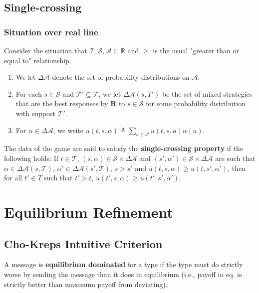 \documentclass[11pt]{elegantbook}
\begin{document}
\subsection{Single-crossing}

\subsubsection{Situation over real line}
Consider the situation that $\mathcal{T},\mathcal{S},\mathcal{A}\subseteq \mathbb{R}$ and $\geq$ is the usual "greater than or equal to" relationship.

\begin{enumerate}
    \item We let $\Delta \mathcal{A}$ denote the set of probability distributions on $\mathcal{A}$.
    \item For each $s\in \mathcal{S}$ and $\mathcal{T}'\subseteq \mathcal{T}$, we let $\Delta\mathcal{A}(s,T')$ be the set of mixed strategies that are the best responses by $\mathbf{R}$ to $s\in \mathcal{S}$ for some probability distribution with support $\mathcal{T}'$.
    \item For $\alpha\in \Delta\mathcal{A}$, we write $u(t,s,\alpha)\triangleq \sum_{a\in \mathcal{A}}u(t,s,a)\alpha(a)$.
\end{enumerate}

\begin{definition}
    \normalfont
    The data of the game are said to satisfy the \textbf{single-crossing property} if the following holds: If $t\in \mathcal{T}$, $(s,\alpha)\in \mathcal{S}\times \Delta\mathcal{A}$ and $(s',\alpha')\in \mathcal{S}\times \Delta\mathcal{A}$ are such that $\alpha\in \Delta\mathcal{A}(s,\mathcal{T})$, $\alpha'\in \Delta\mathcal{A}(s',\mathcal{T})$, $s>s'$ and $u(t,s,\alpha)\geq u(t,s',\alpha')$, then for all $t'\in T$ such that $t'>t$, $u(t',s,\alpha)\geq u(t',s',\alpha')$.
\end{definition}



\section{Equilibrium Refinement}
\subsection{Cho-Kreps Intuitive Criterion}
\begin{definition}
    \normalfont
    A message is \textbf{equilibrium dominated} for a type if the type must do strictly worse by sending the message than it does in equilibrium (i.e., payoff in eq. is strictly better than maximum payoff from deviating).
\end{definition}
\end{document}

